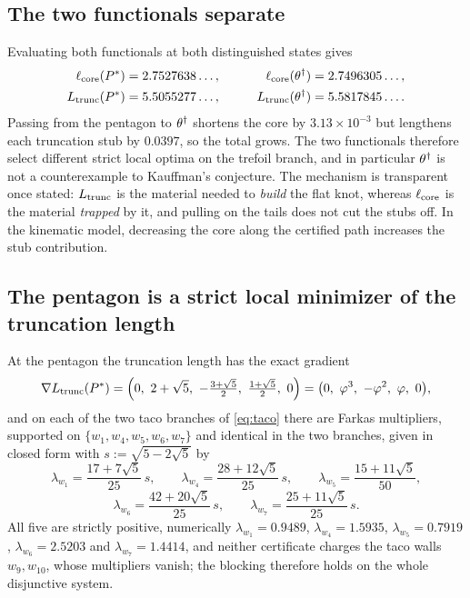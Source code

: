 \subsection{The two functionals separate}

Evaluating both functionals at both distinguished states gives
\begin{equation}\label{eq:separate}
\begin{aligned}
  \ell_{\mathrm{core}}(P^*)&=2.7527638\ldots, &\qquad \ell_{\mathrm{core}}(\theta^\dagger)&=2.7496305\ldots,\\
  L_{\mathrm{trunc}}(P^*)&=5.5055277\ldots, &\qquad L_{\mathrm{trunc}}(\theta^\dagger)&=5.5817845\ldots .
\end{aligned}
\end{equation}
Passing from the pentagon to $\theta^\dagger$ shortens the core by $3.13\times10^{-3}$ but lengthens each truncation stub by $0.0397$, so the total grows. The two functionals therefore select different strict local optima on the trefoil branch, and in particular $\theta^\dagger$ is not a counterexample to Kauffman's conjecture. The mechanism is transparent once stated: $L_{\mathrm{trunc}}$ is the material needed to \emph{build} the flat knot, whereas $\ell_{\mathrm{core}}$ is the material \emph{trapped} by it, and pulling on the tails does not cut the stubs off. In the kinematic model, decreasing the core along the certified path increases the stub contribution.

\subsection{The pentagon is a strict local minimizer of the truncation length}

\begin{theorem}\label{thm:kauffmanfarkas}
At the pentagon the truncation length has the exact gradient
\begin{equation}\label{eq:gradL}
  \nabla\trunc(P^*)=\Bigl(0,\ 2+\sqrt5,\ -\tfrac{3+\sqrt5}2,\ \tfrac{1+\sqrt5}2,\ 0\Bigr)=\bigl(0,\ \varphi^3,\ -\varphi^2,\ \varphi,\ 0\bigr),
\end{equation}
and on each of the two taco branches of \eqref{eq:taco} there are Farkas multipliers, supported on $\{w_1,w_4,w_5,w_6,w_7\}$ and identical in the two branches, given in closed form with $s:=\sqrt{5-2\sqrt5}$ by
\begin{equation}\label{eq:kauffmanlam1}
  \lambda_{w_1}=\frac{17+7\sqrt5}{25}\,s,\qquad
  \lambda_{w_4}=\frac{28+12\sqrt5}{25}\,s,\qquad
  \lambda_{w_5}=\frac{15+11\sqrt5}{50},
\end{equation}
\begin{equation}\label{eq:kauffmanlam2}
  \lambda_{w_6}=\frac{42+20\sqrt5}{25}\,s,\qquad
  \lambda_{w_7}=\frac{25+11\sqrt5}{25}\,s .
\end{equation}
All five are strictly positive, numerically $\lambda_{w_1}=0.9489$, $\lambda_{w_4}=1.5935$, $\lambda_{w_5}=0.7919$, $\lambda_{w_6}=2.5203$ and $\lambda_{w_7}=1.4414$, and neither certificate charges the taco walls $w_9,w_{10}$, whose multipliers vanish; the blocking therefore holds on the whole disjunctive system.
\end{theorem}

